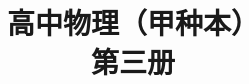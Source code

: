 \documentclass[b5paper, openany]{ctexbook}
\theoremstyle{plain}
\begin{document}














\title{高中物理（甲种本）\\
第三册}

\author{}
\date{}

\maketitle

\tableofcontents


\frontmatter



\mainmatter













\begin{appendix}
	
\end{appendix}
\end{document}
